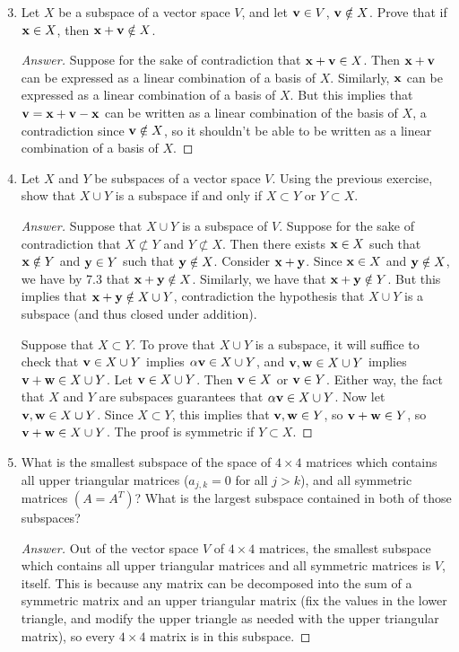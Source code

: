 \documentclass[../psets.tex]{subfiles}
\begin{document}
\begin{enumerate}[label={\textbf{7.\arabic*.}}]
    \setcounter{enumi}{2}
    \item Let $X$ be a subspace of a vector space $V$, and let $\mathbf{v}\in V$, $\mathbf{v}\notin X$. Prove that if $\mathbf{x}\in X$, then $\mathbf{x}+\mathbf{v}\notin X$.
    \begin{proof}[Answer]
        Suppose for the sake of contradiction that $\mathbf{x}+\mathbf{v}\in X$. Then $\mathbf{x}+\mathbf{v}$ can be expressed as a linear combination of a basis of $X$. Similarly, $\mathbf{x}$ can be expressed as a linear combination of a basis of $X$. But this implies that $\mathbf{v}=\mathbf{x}+\mathbf{v}-\mathbf{x}$ can be written as a linear combination of the basis of $X$, a contradiction since $\mathbf{v}\notin X$, so it shouldn't be able to be written as a linear combination of a basis of $X$.
    \end{proof}
    \item Let $X$ and $Y$ be subspaces of a vector space $V$. Using the previous exercise, show that $X\cup Y$ is a subspace if and only if $X\subset Y$ or $Y\subset X$.
    \begin{proof}[Answer]
        Suppose that $X\cup Y$ is a subspace of $V$. Suppose for the sake of contradiction that $X\not\subset Y$ and $Y\not\subset X$. Then there exists $\mathbf{x}\in X$ such that $\mathbf{x}\notin Y$ and $\mathbf{y}\in Y$ such that $\mathbf{y}\notin X$. Consider $\mathbf{x}+\mathbf{y}$. Since $\mathbf{x}\in X$ and $\mathbf{y}\notin X$, we have by 7.3 that $\mathbf{x}+\mathbf{y}\notin X$. Similarly, we have that $\mathbf{x}+\mathbf{y}\notin Y$. But this implies that $\mathbf{x}+\mathbf{y}\notin X\cup Y$, contradiction the hypothesis that $X\cup Y$ is a subspace (and thus closed under addition).\par
        Suppose that $X\subset Y$. To prove that $X\cup Y$ is a subspace, it will suffice to check that $\mathbf{v}\in X\cup Y$ implies $\alpha\mathbf{v}\in X\cup Y$, and $\mathbf{v},\mathbf{w}\in X\cup Y$ implies $\mathbf{v}+\mathbf{w}\in X\cup Y$. Let $\mathbf{v}\in X\cup Y$. Then $\mathbf{v}\in X$ or $\mathbf{v}\in Y$. Either way, the fact that $X$ and $Y$ are subspaces guarantees that $\alpha\mathbf{v}\in X\cup Y$. Now let $\mathbf{v},\mathbf{w}\in X\cup Y$. Since $X\subset Y$, this implies that $\mathbf{v},\mathbf{w}\in Y$, so $\mathbf{v}+\mathbf{w}\in Y$, so $\mathbf{v}+\mathbf{w}\in X\cup Y$. The proof is symmetric if $Y\subset X$.
    \end{proof}
    \item What is the smallest subspace of the space of $4\times 4$ matrices which contains all upper triangular matrices ($a_{j,k}=0$ for all $j>k$), and all symmetric matrices $(A=A^T)$? What is the largest subspace contained in both of those subspaces?
    \begin{proof}[Answer]
        Out of the vector space $V$ of $4\times 4$ matrices, the smallest subspace which contains all upper triangular matrices and all symmetric matrices is $V$, itself. This is because any matrix can be decomposed into the sum of a symmetric matrix and an upper triangular matrix (fix the values in the lower triangle, and modify the upper triangle as needed with the upper triangular matrix), so every $4\times 4$ matrix is in this subspace.\par

\end{proof}
\end{enumerate}
\end{document}
